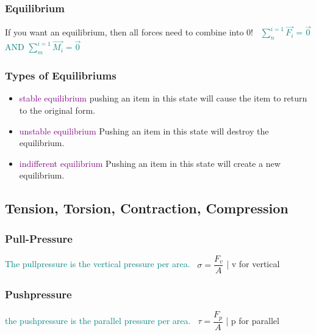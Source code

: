 \documentclass[main.tex,fontsize=8pt,paper=a4,paper=portrait,DIV=calc,]{scrartcl}
\begin{document}
\begin{multicols*}{2}
\subsubsection{Equilibrium}
If you want an equilibrium, then all forces need to combine into 0!\newline
\, \newline
\Large \textcolor{teal}{\( \displaystyle\sum_{n}^{i=1}\vec{F_i} = \vec{0} \) AND \( \displaystyle\sum_{m}^{i=1} \vec{M_i} = \vec{0} \)}\newline
\normalsize 

\subsubsection{Types of Equilibriums}
\begin{itemize}
\item \textcolor{purple}{stable equilibrium}\newline
pushing an item in this state will cause the item to return to the original form.
\item \textcolor{purple}{unstable equilibrium}\newline
Pushing an item in this state will destroy the equilibrium.
\item \textcolor{purple}{indifferent equilibrium}\newline
Pushing an item in this state will create a new equilibrium.

\end{itemize} 

\subsection{Tension, Torsion, Contraction, Compression}
\subsubsection{Pull-Pressure} 
\textcolor{teal}{The pullpressure is the vertical pressure per area.}\newline
\, \newline
\large \( \sigma = \dfrac{F_v}{A} \) | v for vertical\newline
\normalsize 

\subsubsection{Pushpressure} 
\textcolor{teal}{the pushpressure is the parallel pressure per area.}\newline
\, \newline
\large \( \tau = \dfrac{F_p}{A} \) | p for parallel\newline
\normalsize 


\end{multicols*}
\end{document}

